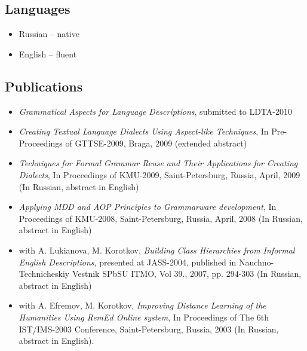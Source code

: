\documentclass[a4paper, 12pt]{article}
\begin{document}
\subsection*{Languages}

\begin{itemize}
	\item Russian -- native
	\item English -- fluent
\end{itemize}

\subsection*{Publications}
\begin{itemize}
	\item {\it Grammatical Aspects for Language Descriptions}, submitted to LDTA-2010
	\item {\it Creating Textual Language Dialects Using Aspect-like Techniques}, In Pre-Proceedings of GTTSE-2009, Braga, 2009 (extended abstract)
	\item {\it Techniques for Formal Grammar Reuse and Their Applications for Creating Dialects}, In Proceedings of KMU-2009, Saint-Petersburg, Russia, April, 2009 (In Russian, abstract in English)
	\item {\it Applying MDD and AOP Principles to Grammarware development}, In Proceedings of KMU-2008, Saint-Petersburg, Russia, April, 2008 (In Russian, abstract in English)
	\item with A. Lukianova, M. Korotkov, {\it Building Class Hierarchies from Informal English Descriptions}, presented at JASS-2004, published in Nauchno-Technicheskiy Vestnik SPbSU ITMO, Vol 39., 2007, pp. 294-303 (In Russian, abstract in English)
	\item with A. Efremov, M. Korotkov, {\it Improving Distance Learning of the Humanities Using {\it RemEd} Online system}, In Proceedings of The 6th IST/IMS-2003 Conference, Saint-Petersburg, Russia, 2003 (In Russian, abstract in English).
\end{itemize}
\end{document}
